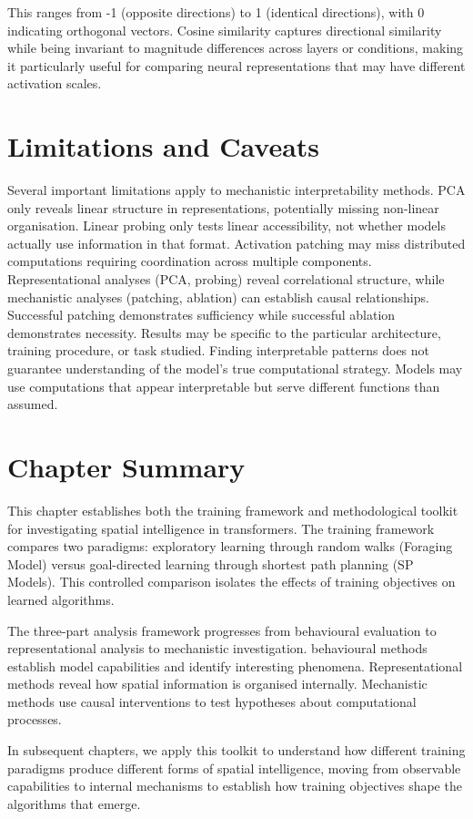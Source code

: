 This ranges from -1 (opposite directions) to 1 (identical directions), with 0 indicating orthogonal vectors. Cosine similarity captures directional similarity while being invariant to magnitude differences across layers or conditions, making it particularly useful for comparing neural representations that may have different activation scales.

\section{Limitations and Caveats}

Several important limitations apply to mechanistic interpretability methods. PCA only reveals linear structure in representations, potentially missing non-linear organisation. Linear probing only tests linear accessibility, not whether models actually use information in that format. Activation patching may miss distributed computations requiring coordination across multiple components. Representational analyses (PCA, probing) reveal correlational structure, while mechanistic analyses (patching, ablation) can establish causal relationships. Successful patching demonstrates sufficiency while successful ablation demonstrates necessity. Results may be specific to the particular architecture, training procedure, or task studied. Finding interpretable patterns does not guarantee understanding of the model's true computational strategy. Models may use computations that appear interpretable but serve different functions than assumed.


\section{Chapter Summary}

This chapter establishes both the training framework and methodological toolkit for investigating spatial intelligence in transformers. The training framework compares two paradigms: exploratory learning through random walks (Foraging Model) versus goal-directed learning through shortest path planning (SP Models). This controlled comparison isolates the effects of training objectives on learned algorithms.

The three-part analysis framework progresses from behavioural evaluation to representational analysis to mechanistic investigation. behavioural methods establish model capabilities and identify interesting phenomena. Representational methods reveal how spatial information is organised internally. Mechanistic methods use causal interventions to test hypotheses about computational processes.

In subsequent chapters, we apply this toolkit to understand how different training paradigms produce different forms of spatial intelligence, moving from observable capabilities to internal mechanisms to establish how training objectives shape the algorithms that emerge.